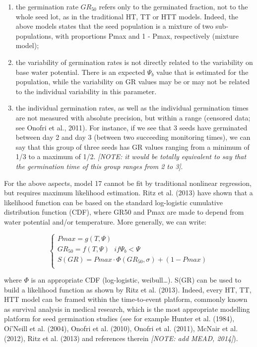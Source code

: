 \documentclass[a4paper,12pt]{article}
\providecommand{\tightlist}{%
	\setlength{\itemsep}{0pt}\setlength{\parskip}{0pt}}
\begin{document}
\begin{enumerate}
\def\labelenumi{\arabic{enumi}.}
\tightlist
\item
  the germination rate \(GR_50\) refers only to the germinated fraction,
  not to the whole seed lot, as in the traditional HT, TT or HTT models.
  Indeed, the above models states that the seed population is a mixture
  of two sub-populations, with proportions Pmax and 1 - Pmax,
  respectively (mixture model);
\item
  the variability of germination rates is not directly related to the
  variability on base water potential. There is an expected \(\Psi_b\)
  value that is estimated for the population, while the variability on
  GR values may be or may not be related to the individual variability
  in this parameter.
\item
  the individual germination rates, as well as the individual
  germination times are not measured with absolute precision, but within
  a range (censored data; see Onofri et al., 2011). For instance, if we
  see that 3 seeds have germinated between day 2 and day 3 (between two
  succeeding monitoring times), we can say that this group of three
  seeds has GR values ranging from a minimum of 1/3 to a maximum of 1/2.
  \emph{{[}NOTE: it would be totally equivalent to say that the
  germination time of this group ranges from 2 to 3{]}}.
\end{enumerate}

For the above aspects, model 17 cannot be fit by traditional nonlinear
regression, but requires maximum likelihood estimation. Ritz et al.
(2013) have shown that a likelihood function can be based on the
standard log-logistic cumulative distribution function (CDF), where GR50
and Pmax are made to depend from water potential and/or temperature.
More generally, we can write:

\[\left\{ {\begin{array}{*{20}{l}}
  Pmax = g(T, \Psi) \\
  GR_{50} = f(T, \Psi) \,\,\,\, if \Psi_b < \Psi \\
  S(GR) = Pmax \cdot \Phi(GR_{50}, \sigma) + (1 - Pmax)\\
\end{array}} \right.\]

where \(\Phi\) is an appropriate CDF (log-logistic, weibull\ldots{}).
S(GR) can be used to build a likelihood function as shown by Ritz et al.
(2013). Indeed, every HT, TT, HTT model can be framed within the
time-to-event platform, commonly known as survival analysis in medical
research, which is the most appropriate modelling platform for seed
germination studies (see for example Hunter et al. (1984), Oí'Neill et
al. (2004), Onofri et al. (2010), Onofri et al. (2011), McNair et al.
(2012), Ritz et al. (2013) and references therein \emph{{[}NOTE: add
MEAD, 2014{]}}).
\end{document}
